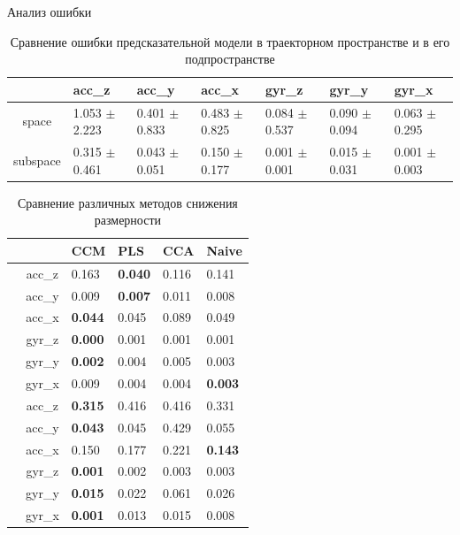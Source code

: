 \documentclass{beamer}
\begin{document}
	\begin{frame}{Анализ ошибки}
		\begin{table}[bhtp]
			\fontsize{4pt}{8pt}
			\selectfont
			\centering
			\caption{Сравнение ошибки предсказательной модели в траекторном пространстве и в его подпространстве}
			\label{tbl:space_and_subspace}
			\begin{tabularx}{\textwidth}{c|XXXXXX}
				\hline
				& acc\_z & acc\_y & acc\_x & gyr\_z & gyr\_y & gyr\_x \\
				\hline
				space & 1.053 $\pm$ 2.223 & 0.401 $\pm$ 0.833 & 0.483 $\pm$ 0.825 & 0.084 $\pm$ 0.537 & 0.090 $\pm$ 0.094 & 0.063 $\pm$ 0.295 \\
				subspace & 0.315 $\pm$ 0.461 & 0.043 $\pm$ 0.051 & 0.150 $\pm$ 0.177 & 0.001 $\pm$ 0.001	& 0.015 $\pm$ 0.031 & 0.001 $\pm$ 0.003 \\
				\hline
			\end{tabularx}
		\end{table}
	
		\begin{table}[bhtp]
			\tiny
			\centering
			\caption{Сравнение различных методов снижения размерности}
			\label{tbl:methods}
			\begin{tabular}{l|c|llll}
				\hline
				\multicolumn{2}{l}{\diaghead{\hskip4cm}{Целевой признак}{Метод}} \vline & CCM & PLS & CCA & Naive \\
				\hline
				\multirow{6}{*}{\rotatebox[origin=c]{90}{cyclic}} & acc\_z & 0.163 & \textbf{0.040} & 0.116 & 0.141 \\
				& acc\_y & 0.009 & \textbf{0.007} & 0.011 & 0.008 \\
				& acc\_x & \textbf{0.044} & 0.045 & 0.089 & 0.049 \\
				& gyr\_z & \textbf{0.000} & 0.001 & 0.001 & 0.001 \\
				& gyr\_y & \textbf{0.002} & 0.004 & 0.005 & 0.003 \\
				& gyr\_x & 0.009 & 0.004 & 0.004 & \textbf{0.003} \\
				\hline
				\multirow{6}{*}{\rotatebox[origin=c]{90}{chaotic}} & acc\_z & \textbf{0.315} & 0.416 & 0.416 & 0.331 \\
				& acc\_y & \textbf{0.043} & 0.045 & 0.429 & 0.055 \\
				& acc\_x & 0.150 & 0.177 & 0.221 & \textbf{0.143} \\
				& gyr\_z & \textbf{0.001} & 0.002 & 0.003 & 0.003 \\
				& gyr\_y & \textbf{0.015} & 0.022 & 0.061 & 0.026 \\
				& gyr\_x & \textbf{0.001} & 0.013 & 0.015 & 0.008 \\
				\hline   
			\end{tabular}
		\end{table}
	\end{frame}
\end{document}
